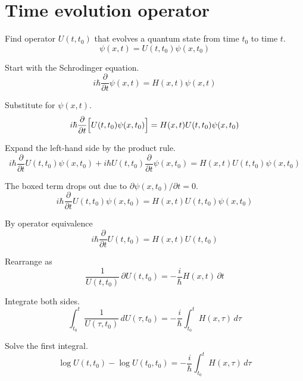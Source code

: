 

\section*{Time evolution operator}

Find operator $U(t,t_0)$ that evolves a quantum state
from time $t_0$ to time $t$.
\begin{equation*}
\psi(x,t)=U(t,t_0)\psi(x,t_0)
\end{equation*}

Start with the Schrodinger equation.
\begin{equation*}
i\hbar\frac{\partial}{\partial t}\psi(x,t)=H(x,t)\psi(x,t)
\end{equation*}

Substitute for $\psi(x,t)$.
\begin{equation*}
i\hbar\frac{\partial}{\partial t}\Bigl[U(t,t_0)\psi(x,t_0)\Bigr]=H(x,t)U(t,t_0)\psi(x,t_0)
\end{equation*}

Expand the left-hand side by the product rule.
\begin{equation*}
i\hbar\frac{\partial}{\partial t}U(t,t_0)\psi(x,t_0)
+\boxed{i\hbar U(t,t_0)\frac{\partial}{\partial t}\psi(x,t_0)}
=H(x,t)U(t,t_0)\psi(x,t_0)
\end{equation*}

The boxed term drops out due to $\partial\psi(x,t_0)/\partial t=0$.
\begin{equation*}
i\hbar\frac{\partial}{\partial t}U(t,t_0)\psi(x,t_0)
=H(x,t)U(t,t_0)\psi(x,t_0)
\end{equation*}

By operator equivalence
\begin{equation*}
i\hbar\frac{\partial}{\partial t}U(t,t_0)
=H(x,t)U(t,t_0)
\end{equation*}

Rearrange as
\begin{equation*}
\frac{1}{U(t,t_0)}\,\partial U(t,t_0)=-\frac{i}{\hbar}H(x,t)\,\partial t
\end{equation*}

Integrate both sides.
\begin{equation*}
\int_{t_0}^t\frac{1}{U(\tau,t_0)}\,dU(\tau,t_0)=-\frac{i}{\hbar}\int_{t_0}^t H(x,\tau)\,d\tau
\end{equation*}

Solve the first integral.
\begin{equation*}
\log U(t,t_0)-\boxed{\log U(t_0,t_0)}
=-\frac{i}{\hbar}\int_{t_0}^t H(x,\tau)\,d\tau
\end{equation*}

